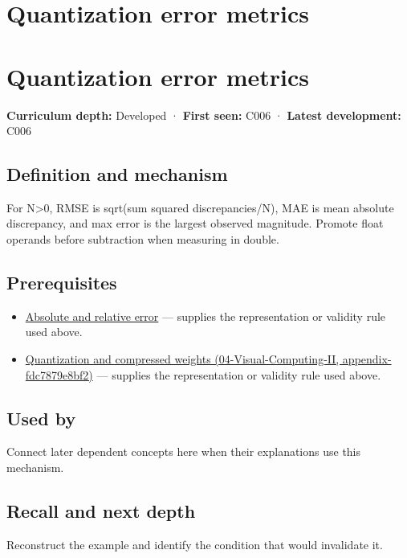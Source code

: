 \hypertarget{appendix-537171d69d27}{}
\section*{Quantization error metrics}
\section{Quantization error metrics}\label{quantization-error-metrics}

\textbf{Curriculum depth:} Developed · \textbf{First seen:} C006 · \textbf{Latest development:} C006

\subsection{Definition and mechanism}\label{definition-and-mechanism}

For N\textgreater0, RMSE is sqrt(sum squared discrepancies/N), MAE is mean absolute discrepancy, and max error is the largest observed magnitude. Promote float operands before subtraction when measuring in double.

\subsection{Prerequisites}\label{prerequisites}

\begin{itemize}
\tightlist
\item
  \hyperref[appendix-3ae74e89b4e6]{Absolute and relative error} --- supplies the representation or validity rule used above.
\item
  \href{}{Quantization and compressed weights (04-Visual-Computing-II, appendix-fdc7879e8bf2)} --- supplies the representation or validity rule used above.
\end{itemize}

\subsection{Used by}\label{used-by}

Connect later dependent concepts here when their explanations use this mechanism.

\subsection{Recall and next depth}\label{recall-and-next-depth}

Reconstruct the example and identify the condition that would invalidate it.

